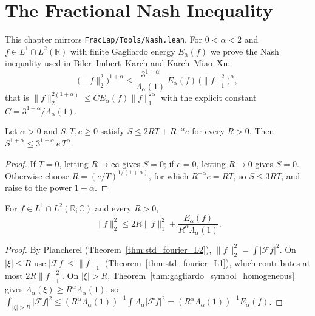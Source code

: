\chapter{The Fractional Nash Inequality}

This chapter mirrors \texttt{FracLap/Tools/Nash.lean}. For $0 < \alpha < 2$ and $f \in L^1 \cap L^2(\mathbb{R})$ with finite Gagliardo energy $E_\alpha(f)$ we prove the Nash inequality used in Biler--Imbert--Karch and Karch--Miao--Xu:
\[
  \bigl(\lVert f \rVert_2^2\bigr)^{1+\alpha} \le \frac{3^{1+\alpha}}{\Lambda_\alpha(1)}\, E_\alpha(f)\, \bigl(\lVert f \rVert_1^2\bigr)^{\alpha},
\]
that is $\lVert f \rVert_2^{2(1+\alpha)} \le C E_\alpha(f) \lVert f \rVert_1^{2\alpha}$ with the explicit constant $C = 3^{1+\alpha} / \Lambda_\alpha(1)$.

\begin{lemma}\label{lem:nash_optimize}
\leanok
Let $\alpha > 0$ and $S, T, e \ge 0$ satisfy $S \le 2 R T + R^{-\alpha} e$ for every $R > 0$. Then $S^{1+\alpha} \le 3^{1+\alpha}\, e\, T^\alpha$.
\end{lemma}

\begin{proof}
\leanok
If $T = 0$, letting $R \to \infty$ gives $S = 0$; if $e = 0$, letting $R \to 0$ gives $S = 0$. Otherwise choose $R = (e/T)^{1/(1+\alpha)}$, for which $R^{-\alpha} e = R T$, so $S \le 3 R T$, and raise to the power $1 + \alpha$.
\end{proof}

\begin{lemma}\label{lem:nash_cut}
\leanok
For $f \in L^1 \cap L^2(\mathbb{R}; \mathbb{C})$ and every $R > 0$,
\[
  \lVert f \rVert_2^2 \le 2R \lVert f \rVert_1^2 + \frac{E_\alpha(f)}{R^\alpha \Lambda_\alpha(1)}.
\]
\end{lemma}

\begin{proof}
\leanok
By Plancherel (Theorem~\ref{thm:std_fourier_L2}), $\lVert f \rVert_2^2 = \int \lvert \mathcal{F} f \rvert^2$. On $\lvert \xi \rvert \le R$ use $\lvert \mathcal{F} f \rvert \le \lVert f \rVert_1$ (Theorem~\ref{thm:std_fourier_L1}), which contributes at most $2R \lVert f \rVert_1^2$. On $\lvert \xi \rvert > R$, Theorem~\ref{thm:gagliardo_symbol_homogeneous} gives $\Lambda_\alpha(\xi) \ge R^\alpha \Lambda_\alpha(1)$, so $\int_{\lvert \xi \rvert > R} \lvert \mathcal{F} f \rvert^2 \le (R^\alpha \Lambda_\alpha(1))^{-1} \int \Lambda_\alpha \lvert \mathcal{F} f \rvert^2 = (R^\alpha \Lambda_\alpha(1))^{-1} E_\alpha(f)$.
\end{proof}

